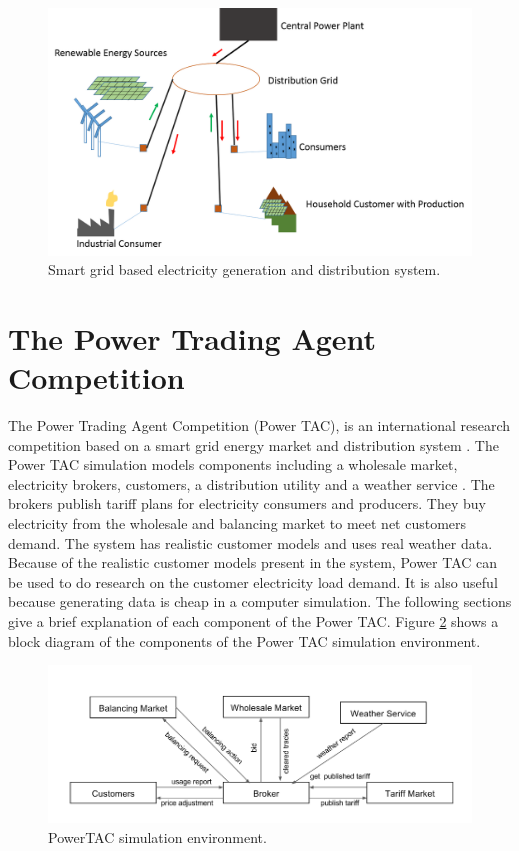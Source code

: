 \begin{figure}[h]
  \includegraphics[width=\linewidth]{smart-grid.png}
  \caption{Smart grid based electricity generation and distribution system.}
  \label{fig:smartgrid}
\end{figure}

\section{The Power Trading Agent Competition}

The Power Trading Agent Competition (Power TAC), is an international research competition based on a smart grid energy market and distribution system \cite{ketter2013power, ketter20162016}. The Power TAC simulation models components including a wholesale market, electricity brokers, customers, a distribution utility and a weather service \cite{ketter20162016}. The brokers publish tariff plans for electricity consumers and producers. They buy electricity from the wholesale and balancing market to meet net customers demand. The system has realistic customer models and uses real weather data. Because of the realistic customer models present in the system, Power TAC can be used to do research on the customer electricity load demand. It is also useful because generating data is cheap in a computer simulation. The following sections give a brief explanation of each component of the Power TAC. Figure \ref{fig:simulation-environment}  shows a block diagram of the components of the Power TAC simulation environment.

\begin{figure}[!h]
  \includegraphics[width=\linewidth]{simulation-environment.png}
  \caption{PowerTAC simulation environment.}
  \label{fig:simulation-environment}
\end{figure}

